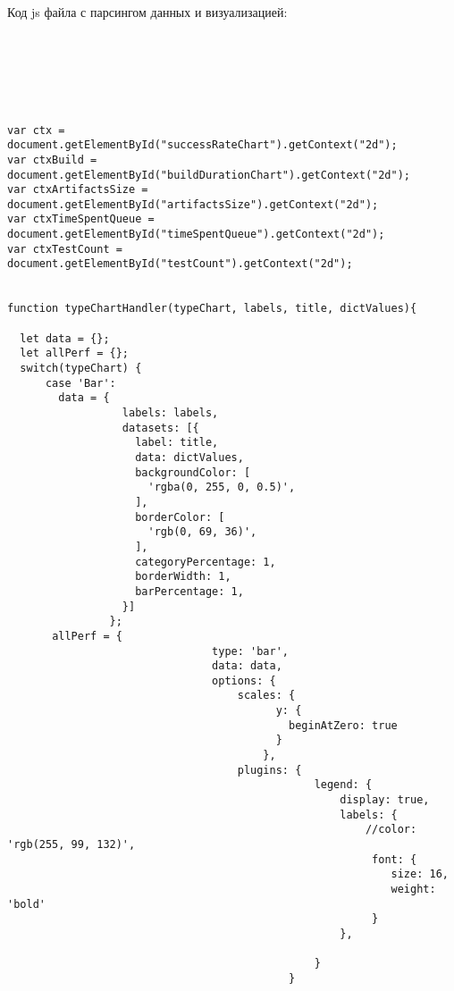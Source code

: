 Код js файла с парсингом данных и визуализацией:

\begin{lstlisting}






var ctx = document.getElementById("successRateChart").getContext("2d");
var ctxBuild = document.getElementById("buildDurationChart").getContext("2d");
var ctxArtifactsSize = document.getElementById("artifactsSize").getContext("2d");
var ctxTimeSpentQueue = document.getElementById("timeSpentQueue").getContext("2d");
var ctxTestCount = document.getElementById("testCount").getContext("2d");


function typeChartHandler(typeChart, labels, title, dictValues){

  let data = {};
  let allPerf = {};
  switch(typeChart) {
      case 'Bar':
        data = {
                  labels: labels,
                  datasets: [{
                    label: title,
                    data: dictValues,
                    backgroundColor: [
                      'rgba(0, 255, 0, 0.5)',
                    ],
                    borderColor: [
                      'rgb(0, 69, 36)',
                    ],
                    categoryPercentage: 1,
                    borderWidth: 1,
                    barPercentage: 1,
                  }]
                };
       allPerf = {
                                type: 'bar',
                                data: data,
                                options: {
                                    scales: {
                                          y: {
                                            beginAtZero: true
                                          }
                                        },
                                    plugins: {
                                                legend: {
                                                    display: true,
                                                    labels: {
                                                        //color: 'rgb(255, 99, 132)',
                                                         font: {
                                                            size: 16,
                                                            weight: 'bold'
                                                         }
                                                    },

                                                }
                                            }


\end{lstlisting}
